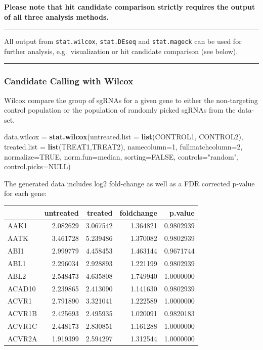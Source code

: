 \documentclass[]{article}
\newenvironment{Shaded}{\begin{snugshade}}{\end{snugshade}}
\newcommand{\KeywordTok}[1]{\textcolor[rgb]{0.13,0.29,0.53}{\textbf{{#1}}}}
\newcommand{\DataTypeTok}[1]{\textcolor[rgb]{0.13,0.29,0.53}{{#1}}}
\newcommand{\DecValTok}[1]{\textcolor[rgb]{0.00,0.00,0.81}{{#1}}}
\newcommand{\StringTok}[1]{\textcolor[rgb]{0.31,0.60,0.02}{{#1}}}
\newcommand{\OtherTok}[1]{\textcolor[rgb]{0.56,0.35,0.01}{{#1}}}
\newcommand{\NormalTok}[1]{{#1}}
\begin{document}
\textbf{Please note that hit candidate comparison strictly requires the
output of all three analysis methods.}

\begin{center}\rule{0.5\linewidth}{\linethickness}\end{center}

All output from \texttt{stat.wilcox}, \texttt{stat.DEseq} and
\texttt{stat.mageck} can be used for further analysis,
e.g.~visualization or hit candidate comparison (see below).

\begin{center}\rule{0.5\linewidth}{\linethickness}\end{center}

\newpage

\subsubsection{Candidate Calling with
Wilcox}\label{candidate-calling-with-wilcox}

Wilcox compare the group of sgRNAs for a given gene to either the
non-targeting control population or the population of randomly picked
sgRNAs from the data-set.

\begin{Shaded}
\begin{Highlighting}[]
\NormalTok{data.wilcox =}\StringTok{ }\KeywordTok{stat.wilcox}\NormalTok{(}\DataTypeTok{untreated.list =} \KeywordTok{list}\NormalTok{(CONTROL1, CONTROL2),}
  \DataTypeTok{treated.list =} \KeywordTok{list}\NormalTok{(TREAT1,TREAT2), }\DataTypeTok{namecolumn=}\DecValTok{1}\NormalTok{, }\DataTypeTok{fullmatchcolumn=}\DecValTok{2}\NormalTok{,}
  \DataTypeTok{normalize=}\OtherTok{TRUE}\NormalTok{, }\DataTypeTok{norm.fun=}\NormalTok{median, }\DataTypeTok{sorting=}\OtherTok{FALSE}\NormalTok{, }\DataTypeTok{controls=}\StringTok{"random"}\NormalTok{,}
  \DataTypeTok{control.picks=}\OtherTok{NULL}\NormalTok{)}
\end{Highlighting}
\end{Shaded}

The generated data includes log2 fold-change as well as a FDR corrected
p-value for each gene:

\begin{longtable}[c]{@{}lrrrr@{}}
\toprule
& untreated & treated & foldchange & p.value\tabularnewline
\midrule
\endhead
AAK1 & 2.082629 & 3.067542 & 1.364821 & 0.9802939\tabularnewline
AATK & 3.461728 & 5.239486 & 1.370082 & 0.9802939\tabularnewline
ABI1 & 2.999779 & 4.458453 & 1.463144 & 0.9671744\tabularnewline
ABL1 & 2.296034 & 2.928893 & 1.221199 & 0.9802939\tabularnewline
ABL2 & 2.548473 & 4.635808 & 1.749940 & 1.0000000\tabularnewline
ACAD10 & 2.239865 & 2.413090 & 1.141630 & 0.9802939\tabularnewline
ACVR1 & 2.791890 & 3.321041 & 1.222589 & 1.0000000\tabularnewline
ACVR1B & 2.425693 & 2.495935 & 1.020091 & 0.9820183\tabularnewline
ACVR1C & 2.448173 & 2.830851 & 1.161288 & 1.0000000\tabularnewline
ACVR2A & 1.919399 & 2.594297 & 1.312544 & 1.0000000\tabularnewline
\bottomrule
\end{longtable}
\end{document}
